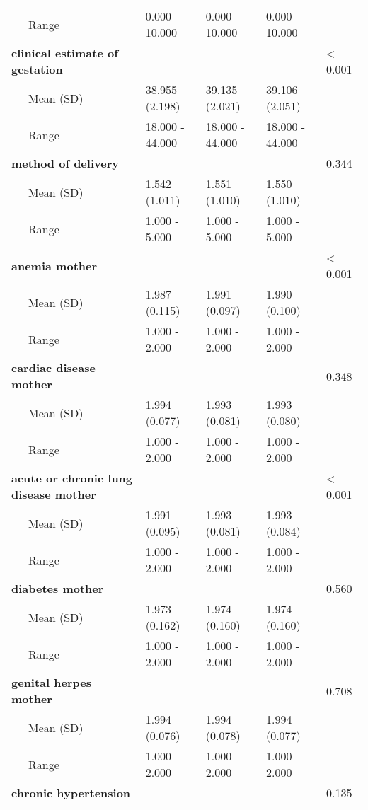 \begin{longtable}[c]{@{}lllll@{}}
\\\addlinespace
~~~Range & 0.000 - 10.000 & 0.000 - 10.000 & 0.000 - 10.000 &
\\\addlinespace
\textbf{clinical estimate of gestation} & & & & \textless{} 0.001
\\\addlinespace
~~~Mean (SD) & 38.955 (2.198) & 39.135 (2.021) & 39.106 (2.051) &
\\\addlinespace
~~~Range & 18.000 - 44.000 & 18.000 - 44.000 & 18.000 - 44.000 &
\\\addlinespace
\textbf{method of delivery} & & & & 0.344
\\\addlinespace
~~~Mean (SD) & 1.542 (1.011) & 1.551 (1.010) & 1.550 (1.010) &
\\\addlinespace
~~~Range & 1.000 - 5.000 & 1.000 - 5.000 & 1.000 - 5.000 &
\\\addlinespace
\textbf{anemia mother} & & & & \textless{} 0.001
\\\addlinespace
~~~Mean (SD) & 1.987 (0.115) & 1.991 (0.097) & 1.990 (0.100) &
\\\addlinespace
~~~Range & 1.000 - 2.000 & 1.000 - 2.000 & 1.000 - 2.000 &
\\\addlinespace
\textbf{cardiac disease mother} & & & & 0.348
\\\addlinespace
~~~Mean (SD) & 1.994 (0.077) & 1.993 (0.081) & 1.993 (0.080) &
\\\addlinespace
~~~Range & 1.000 - 2.000 & 1.000 - 2.000 & 1.000 - 2.000 &
\\\addlinespace
\textbf{acute or chronic lung disease mother} & & & & \textless{} 0.001
\\\addlinespace
~~~Mean (SD) & 1.991 (0.095) & 1.993 (0.081) & 1.993 (0.084) &
\\\addlinespace
~~~Range & 1.000 - 2.000 & 1.000 - 2.000 & 1.000 - 2.000 &
\\\addlinespace
\textbf{diabetes mother} & & & & 0.560
\\\addlinespace
~~~Mean (SD) & 1.973 (0.162) & 1.974 (0.160) & 1.974 (0.160) &
\\\addlinespace
~~~Range & 1.000 - 2.000 & 1.000 - 2.000 & 1.000 - 2.000 &
\\\addlinespace
\textbf{genital herpes mother} & & & & 0.708
\\\addlinespace
~~~Mean (SD) & 1.994 (0.076) & 1.994 (0.078) & 1.994 (0.077) &
\\\addlinespace
~~~Range & 1.000 - 2.000 & 1.000 - 2.000 & 1.000 - 2.000 &
\\\addlinespace
\textbf{chronic hypertension} & & & & 0.135

\end{longtable}
